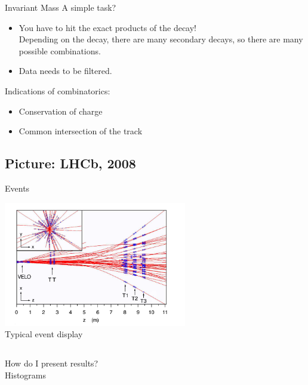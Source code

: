  \begin{frame}{Invariant Mass}
     A simple task?\\ \vspace{0.5cm}
     \begin{itemize}
         \item [\ding{43}] You have to hit the exact products of the decay! \\ \small Depending on the decay, there are many secondary decays, so there are many possible combinations.\normalsize
         \item  [\ding{43}] Data needs to be filtered.
               \end{itemize}\vspace{0.5cm}
           Indications of combinatorics:
           
          \begin{itemize}
         \item [\ding{202}]Conservation of charge
         \item [\ding{203}]Common intersection of the track
                    \end{itemize}
\end{frame}
\subsection{Picture: LHCb, 2008}
\begin{frame}{Events}
\begin{center}
     \includegraphics[width=8cm]{Figures Lecture on Datanalysis/2D-Eventdisplay.png} \\
    Typical event display
\end{center}
   \end{frame}
   \subsection{}
   \begin{frame}

        \Large How do I present results? \\ 
        \quad Histograms 

\end{frame}


